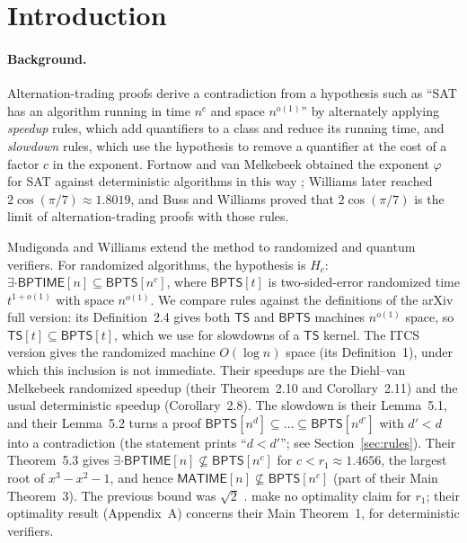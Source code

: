 \documentclass[11pt]{article}
\theoremstyle{definition}
\newcommand{\TS}{\mathsf{TS}}
\newcommand{\BPTS}{\mathsf{BPTS}}
\newcommand{\BPTIME}{\mathsf{BPTIME}}
\newcommand{\MATIME}{\mathsf{MATIME}}
\begin{document}
\section{Introduction}

\paragraph{Background.}
Alternation-trading proofs \cite{W13} derive a contradiction from a hypothesis such as ``SAT has an algorithm running in time $n^c$ and space $n^{o(1)}$'' by alternately applying \emph{speedup} rules, which add quantifiers to a class and reduce its running time, and \emph{slowdown} rules, which use the hypothesis to remove a quantifier at the cost of a factor $c$ in the exponent. Fortnow and van Melkebeek obtained the exponent $\varphi$ for SAT against deterministic algorithms in this way \cite{FvM00,FLvMV05}; Williams later reached $2\cos(\pi/7)\approx1.8019$, and Buss and Williams \cite{BW15} proved that $2\cos(\pi/7)$ is the limit of alternation-trading proofs with those rules.

Mudigonda and Williams \cite{MW21} extend the method to randomized and quantum verifiers. For randomized algorithms, the hypothesis is $H_c$: $\exists\cdot\BPTIME[n]\subseteq\BPTS[n^c]$, where $\BPTS[t]$ is two-sided-error randomized time $t^{1+o(1)}$ with space $n^{o(1)}$. We compare rules against the definitions of the arXiv full version: its Definition~2.4 gives both $\TS$ and $\BPTS$ machines $n^{o(1)}$ space, so $\TS[t]\subseteq\BPTS[t]$, which we use for slowdowns of a $\TS$ kernel. The ITCS version gives the randomized machine $O(\log n)$ space (its Definition~1), under which this inclusion is not immediate. Their speedups are the Diehl--van Melkebeek randomized speedup \cite{DvM06} (their Theorem~2.10 and Corollary~2.11) and the usual deterministic speedup (Corollary~2.8). The slowdown is their Lemma~5.1, and their Lemma~5.2 turns a proof $\BPTS[n^d]\subseteq\dots\subseteq\BPTS[n^{d'}]$ with $d'<d$ into a contradiction (the statement prints ``$d<d'$''; see Section~\ref{sec:rules}). Their Theorem~5.3 gives $\exists\cdot\BPTIME[n]\not\subseteq\BPTS[n^c]$ for $c<r_1\approx1.4656$, the largest root of $x^3-x^2-1$, and hence $\MATIME[n]\not\subseteq\BPTS[n^c]$ (part of their Main Theorem~3). The previous bound was $\sqrt2$ \cite{DvM06,Die07}. \cite{MW21} make no optimality claim for $r_1$; their optimality result (Appendix~A) concerns their Main Theorem~1, for deterministic verifiers.
\end{document}
